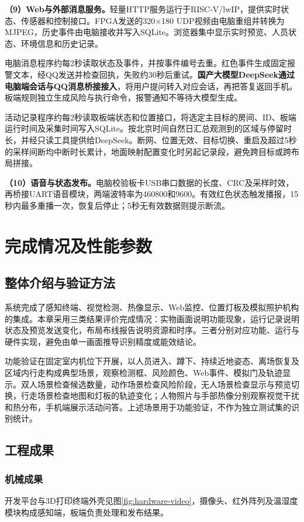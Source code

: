 \documentclass[UTF8,a4paper,zihao=-4,fontset=none,scheme=plain]{ctexart}
\begin{document}
\textbf{（9）Web与外部消息服务。}轻量HTTP服务运行于RISC-V/lwIP，提供实时状态、传感器和控制接口。FPGA发送的320×180 UDP视频由电脑重组并转换为MJPEG，历史事件由电脑接收并写入SQLite。浏览器集中显示实时预览、人员状态、环境信息和历史记录。

电脑消息程序约每2秒读取状态及事件，并按事件编号去重。红色事件生成固定报警文本，经QQ发送并检查回执，失败约30秒后重试。\textbf{国产大模型DeepSeek通过电脑端会话与QQ消息桥接接入}，将用户提问转入对应会话，再把答复返回手机。板端规则独立生成风险与执行命令，报警通知不等待大模型生成。

活动记录程序约每2秒读取板端状态和位置接口，将选定主目标的房间、ID、板端运行时间及采集时间写入SQLite。按北京时间自然日汇总观测到的区域与停留时长，并经只读工具提供给DeepSeek。断网、位置无效、目标切换、重启及超过5秒的采样间断均中断时长累计，地面映射配置变化时另起记录段，避免跨目标或跨布局拼接。

\textbf{（10）语音与状态发布。}电脑校验板卡USB串口数据的长度、CRC及采样时效，再桥接UART语音模块，两端波特率为460800和9600。有效红色状态触发播报，15秒内最多重播一次，恢复后停止；5秒无有效数据则提示断流。

\FloatBarrier
\clearpage
\section{完成情况及性能参数}
\subsection{整体介绍与验证方法}
系统完成了感知终端、视觉检测、热像显示、Web监控、位置灯板及模拟照护机构的集成。本章采用三类结果评价完成情况：实物画面说明功能现象，运行记录说明状态及预览发送变化，布局布线报告说明资源和时序。三者分别对应功能、运行与硬件实现，避免由单一画面推导识别精度或能效结论。

功能验证在固定室内机位下开展，以人员进入、蹲下、持续近地姿态、离场恢复及区域内行走构成典型场景，观察检测框、风险颜色、Web事件、模拟门及轨迹显示\cite{video}。双人场景检查候选数量，动作场景检查风险阶段，无人场景检查显示与预览切换，行走场景检查地图和灯板的轨迹变化；人物照片与手部热像分别观察视觉干扰和热分布，手机端展示活动问答。上述场景用于功能验证，不作为独立测试集的识别统计。

\subsection{工程成果}
\subsubsection{机械成果}
开发平台与3D打印终端外壳见图\ref{fig:hardware-video}，摄像头、红外阵列及温湿度模块构成感知端，板端负责处理和发布结果。
\end{document}
